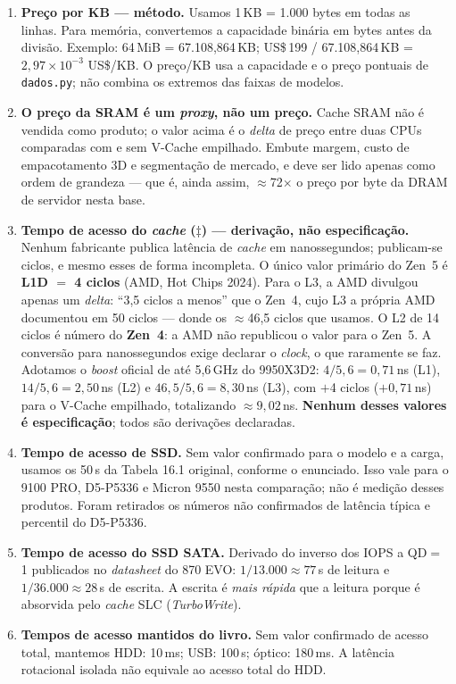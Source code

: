 \documentclass[11pt,a4paper]{article}
\begin{document}
\begin{enumerate}[label=\textbf{N\arabic*.},leftmargin=*]
\item \textbf{Preço por KB --- método.} Usamos 1\,KB = 1.000 bytes em todas as linhas.
      Para memória, convertemos a capacidade binária em bytes antes da divisão.
      Exemplo: 64\,MiB = 67.108,864\,KB; US\$\,199 / 67.108,864\,KB =
      $2{,}97\times10^{-3}$ US\$/KB. O preço/KB usa a capacidade e o preço pontuais de
      \texttt{dados.py}; não combina os extremos das faixas de modelos.

\item \textbf{O preço da SRAM é um \emph{proxy}, não um preço.} Cache SRAM não é vendida
      como produto; o valor acima é o \emph{delta} de preço entre duas CPUs comparadas com e
      sem V-Cache empilhado. Embute margem, custo de empacotamento 3D e segmentação de
      mercado, e deve ser lido apenas como ordem de grandeza --- que é, ainda assim,
      $\approx$72$\times$ o preço por byte da DRAM de servidor nesta base.
\item \textbf{Tempo de acesso do \emph{cache} ($\ddagger$) --- derivação, não
      especificação.} Nenhum
      fabricante publica latência de \emph{cache} em nanossegundos; publicam-se ciclos, e
      mesmo esses de forma incompleta. O único valor primário do Zen~5 é
      \textbf{L1D $=$ 4 ciclos} (AMD, Hot Chips 2024). Para o L3, a AMD divulgou apenas um
      \emph{delta}: ``3,5 ciclos a menos'' que o Zen~4, cujo L3 a própria AMD documentou em
      50 ciclos --- donde os $\approx$46{,}5 ciclos que usamos. O L2 de 14 ciclos é número
      do \textbf{Zen~4}: a AMD não republicou o valor para o Zen~5.
      A conversão para nanossegundos exige declarar o \emph{clock}, o que raramente se faz.
      Adotamos o \emph{boost} oficial de até 5,6\,GHz do 9950X3D2:
      $4/5{,}6 = 0{,}71$\,ns (L1), $14/5{,}6 = 2{,}50$\,ns (L2) e
      $46{,}5/5{,}6 = 8{,}30$\,ns (L3), com $+$4 ciclos ($+0{,}71$\,ns) para o V-Cache
      empilhado, totalizando $\approx 9{,}02$\,ns. \textbf{Nenhum desses valores é
      especificação}; todos são derivações declaradas.
\item \textbf{Tempo de acesso de SSD.} Sem valor confirmado para o modelo e a carga,
      usamos os 50\,\textmu s da Tabela 16.1 original, conforme o enunciado.
      Isso vale para o 9100 PRO, D5-P5336 e Micron 9550 nesta comparação;
      não é medição desses produtos. Foram retirados os números não confirmados
      de latência típica e percentil do D5-P5336.

\item \textbf{Tempo de acesso do SSD SATA.} Derivado do inverso dos IOPS a QD$=$1
      publicados no \emph{datasheet} do 870 EVO: $1/13.000 \approx 77$\,\textmu s de leitura
      e $1/36.000 \approx 28$\,\textmu s de escrita. A escrita é \emph{mais rápida} que a
      leitura porque é absorvida pelo \emph{cache} SLC (\emph{TurboWrite}).
\item \textbf{Tempos de acesso mantidos do livro.} Sem valor confirmado de acesso total,
      mantemos HDD: 10\,ms; USB: 100\,\textmu s; óptico: 180\,ms.
      A latência rotacional isolada não equivale ao acesso total do HDD.


\end{enumerate}
\end{document}
